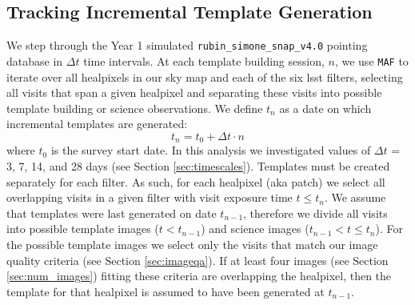 \documentclass[preprintm,linenumbers]{aastex631}
\newcommand{\baseline}{\texttt{one\_snap\_v4.0}\xspace}
\newcommand{\nside}{\texttt{nside}\xspace}
\newcommand{\rubinsim}{\texttt{rubin\_sim}\xspace}
\newcommand{\maf}{\texttt{MAF}\xspace}
\begin{document}
		
		\subsection{Tracking Incremental Template Generation}
		\label{sec:tracking_incremental_template_generation}
		
		We step through the Year 1 simulated \rubinsim \baseline pointing database in $\Delta t$ time intervals. 
  At each template building session, $n$, we use \maf to iterate over all healpixels in our sky map and each of the six \gls*{lsst} filters, selecting all visits that span a given healpixel and separating these visits into possible template building or science observations. 
  We define $t_n$ as a date on which incremental templates are generated:
		\begin{equation}
			t_n= t_0+ \Delta t\cdot n
		\end{equation}
		where $t_0$ is the survey start date. 
  In this analysis we investigated values of $\Delta t$ = 3, 7, 14, and  28 days (see Section \ref{sec:timescales}).
  Templates must be created separately for each filter. 
  As such, for each healpixel (aka patch) we select all overlapping visits in a given filter with visit exposure time $t \leq t_n$. 
  We assume that templates were last generated on date $t_{n-1}$, therefore we divide all visits into possible template images ($t < t_{n-1}$) and science images ($t_{n-1}< t \leq t_n$).
For the possible template images we select only the visits that match our image quality criteria (see Section \ref{sec:imageqa}). 
  If at least four images (see Section \ref{sec:num_images}) fitting these criteria are overlapping the healpixel, then the template for that healpixel is assumed to have been generated at $t_{n-1}$.
  
\end{document}
